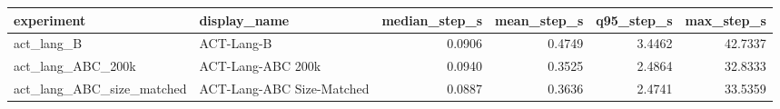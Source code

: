 \begin{tabular}{llrrrr}
\toprule
experiment & display\_name & median\_step\_s & mean\_step\_s & q95\_step\_s & max\_step\_s \\
\midrule
act\_lang\_B & ACT-Lang-B & 0.0906 & 0.4749 & 3.4462 & 42.7337 \\
act\_lang\_ABC\_200k & ACT-Lang-ABC 200k & 0.0940 & 0.3525 & 2.4864 & 32.8333 \\
act\_lang\_ABC\_size\_matched & ACT-Lang-ABC Size-Matched & 0.0887 & 0.3636 & 2.4741 & 33.5359 \\
\bottomrule
\end{tabular}
